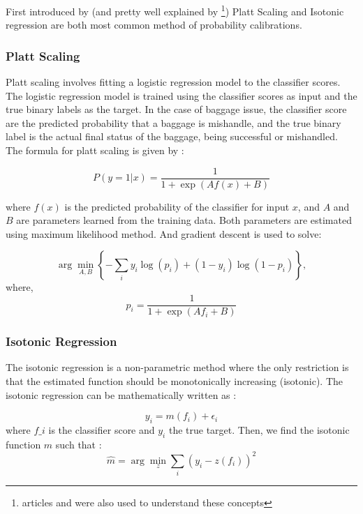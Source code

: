 \documentclass[12pt]{article}
\begin{document}
First introduced by \cite{Zadrozny2002} (and pretty well explained by \cite{ProbabilityCalibration}\footnote{articles \cite{JasonBrownlee} and \cite{ExperianLatAmDataLab} were also used to understand these concepts}) Platt Scaling and Isotonic regression are both most common method of probability calibrations.

\subsubsection{Platt Scaling}
 
Platt scaling involves fitting a logistic regression model to the classifier scores. The logistic regression model is trained using the classifier scores as input and the true binary labels as the target. In the case of baggage issue, the classifier score are the predicted probability that a baggage is mishandle, and the true binary label is the actual final status of the baggage, being successful or mishandled. The formula for platt scaling is given by :

\begin{equation}
P(y=1|x) = \frac{1}{1 + \exp(Af(x) + B)}    
\end{equation}

where \( f(x) \) is the predicted probability of the classifier for input \( x \), and \( A \) and \( B \) are parameters learned from the training data. Both parameters are estimated using maximum likelihood method. And gradient descent is used to solve:

\begin{equation}
\arg\min_{A,B} \left\{ -\sum_{i} y_i \log(p_i) + (1 - y_i) \log(1 - p_i) \right\},
\end{equation}
where,
\begin{equation}
p_i = \frac{1}{1 + \exp(Af_i + B)}
\end{equation}




\subsubsection{Isotonic Regression}

The isotonic regression is a non-parametric method where the only restriction is that the estimated function should be monotonically increasing (isotonic).
The isotonic regression can be mathematically written as :

\begin{equation}
y_i = m(f_i) + \epsilon_i
\end{equation}
 where $f\_i$ is the classifier score and $y_i$ the true target.
 Then, we find the isotonic function $\hat{m}$ such that :
\begin{equation}
\hat{m} = \arg\min_{z} \sum_{i} \left( y_i - z(f_i) \right)^2
\end{equation}
\end{document}
